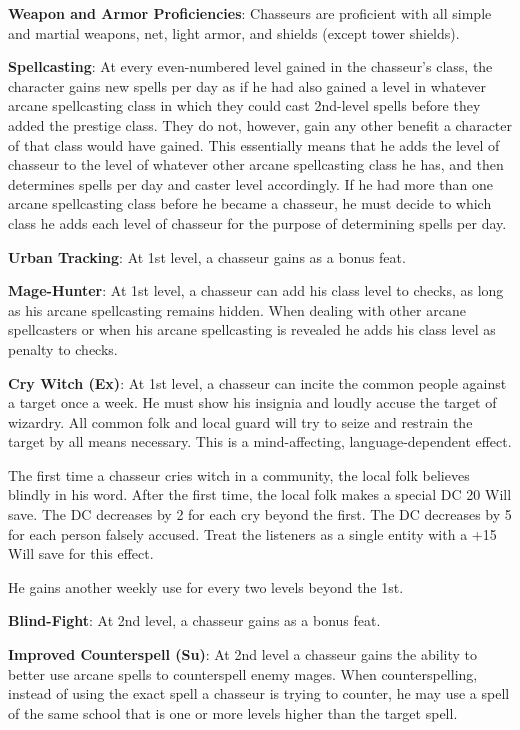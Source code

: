 {
\textbf{Weapon and Armor Proficiencies}: Chasseurs are proficient with all simple and martial weapons, net, light armor, and shields (except tower shields).

\textbf{Spellcasting}: At every even-numbered level gained in the chasseur's class, the character gains new spells per day as if he had also gained a level in whatever arcane spellcasting class in which they could cast 2nd-level spells before they added the prestige class. They do not, however, gain any other benefit a character of that class would have gained. This essentially means that he adds the level of chasseur to the level of whatever other arcane spellcasting class he has, and then determines spells per day and caster level accordingly. If he had more than one arcane spellcasting class before he became a chasseur, he must decide to which class he adds each level of chasseur for the purpose of determining spells per day.

\textbf{Urban Tracking}: At 1st level, a chasseur gains  as a bonus feat.

\textbf{Mage-Hunter}: At 1st level, a chasseur can add his class level to  checks, as long as his arcane spellcasting remains hidden. When dealing with other arcane spellcasters or when his arcane spellcasting is revealed he adds his class level as penalty to  checks.

\textbf{Cry Witch (Ex)}: At 1st level, a chasseur can incite the common people against a target once a week. He must show his insignia and loudly accuse the target of wizardry. All common folk and local guard will try to seize and restrain the target by all means necessary. This is a mind-affecting, language-dependent effect.

The first time a chasseur cries witch in a community, the local folk believes blindly in his word. After the first time, the local folk makes a special DC 20 Will save. The DC decreases by 2 for each cry beyond the first. The DC decreases by 5 for each person falsely accused. Treat the listeners as a single entity with a +15 Will save for this effect.

He gains another weekly use for every two levels beyond the 1st.

\textbf{Blind-Fight}: At 2nd level, a chasseur gains  as a bonus feat.

\textbf{Improved Counterspell (Su)}: At 2nd level a chasseur gains the ability to better use arcane spells to counterspell enemy mages. When counterspelling, instead of using the exact spell a chasseur is trying to counter, he may use a spell of the same school that is one or more levels higher than the target spell.

}
